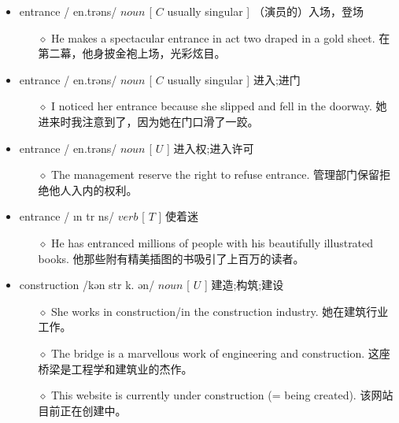 \documentclass[a4paper,top=2.5cm,buttom=2.5cm10.5pt]{book}
\begin{document}
\begin{itemize}
\item entrance / \textprimstress en.trəns/ $ noun $ [  $ C $  usually singular ] （演员的）入场，登场
\begin{itemize}
\item[$\diamond$] He makes a spectacular entrance in act two draped in a gold sheet.
在第二幕，他身披金袍上场，光彩炫目。
\end{itemize}
\end{itemize}
\begin{itemize}
\item entrance / \textprimstress en.trəns/ $ noun $ [  $ C $  usually singular ] 进入;进门
\begin{itemize}
\item[$\diamond$] I noticed her entrance because she slipped and fell in the doorway.
她进来时我注意到了，因为她在门口滑了一跤。
\end{itemize}
\end{itemize}
\begin{itemize}
\item entrance / \textprimstress en.trəns/ $ noun $ [  $ U $  ] 进入权;进入许可
\begin{itemize}
\item[$\diamond$] The management reserve the right to refuse entrance.
管理部门保留拒绝他人入内的权利。
\end{itemize}
\end{itemize}
\begin{itemize}
\item entrance / \i n \textprimstress tr \textscripta  \textlengthmark ns/ $ verb $ [  $ T $  ] 使着迷
\begin{itemize}
\item[$\diamond$] He has entranced millions of people with his beautifully illustrated books.
他那些附有精美插图的书吸引了上百万的读者。
\end{itemize}
\end{itemize}
\begin{itemize}
\item construction /kən \textprimstress str \textturnv k. \textesh ən/ $ noun $ [  $ U $  ] 建造;构筑;建设
\begin{itemize}
\item[$\diamond$] She works in construction/in the construction industry.
她在建筑行业工作。
\item[$\diamond$] The bridge is a marvellous work of engineering and construction.
这座桥梁是工程学和建筑业的杰作。
\item[$\diamond$] This website is currently under construction (= being created).
该网站目前正在创建中。
\end{itemize}
\end{itemize}
\end{document}
